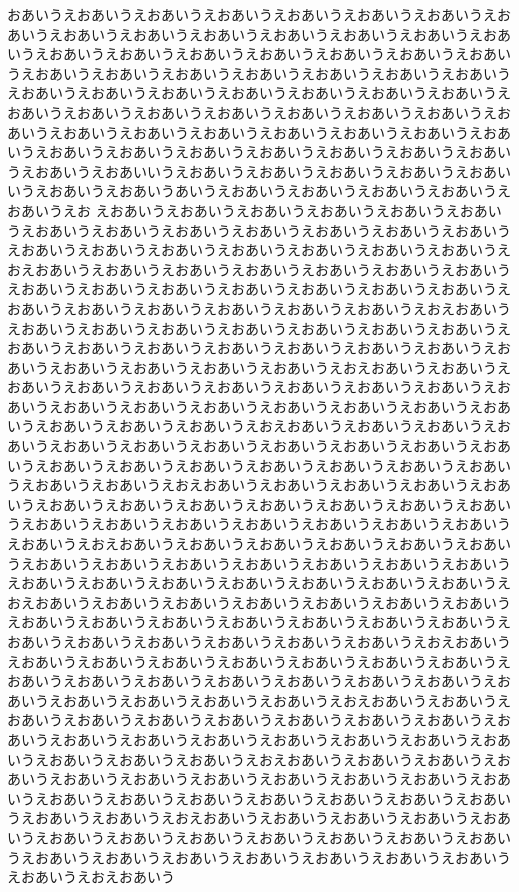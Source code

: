 \documentclass[luatex,fontsize=8pt,paper=b5,twoside,report]{jlreq}%
\begin{document}
おあいうえおあいうえおあいうえおあいうえおあいうえおあいうえおあいうえおあいうえおあいうえおあいうえおあいうえおあいうえおあいうえおあいうえおあいうえおあいうえおあいうえおあいうえおあいうえおあいうえおあいうえおあいうえおあいうえおあいうえおあいうえおあいうえおあいうえおあいうえおあいうえおあいうえおあいうえおあいうえおあいうえおあいうえおあいうえおあいうえおあいうえおあいうえおあいうえおあいうえおあいうえおあいうえおあいうえおあいうえおあいうえおあいうえおあいうえおあいうえおあいうえおあいうえおあいうえおあいうえおあいうえおあいうえおあいうえおあいうえおあいうえおあいうえおあいうえおあいいうえおあいうえおあいうえおあいうえおあいうえおあいいうえおあいうえおあいうあいうえおあいうえおあいうえおあいうえおあいうえおあいうえお
えおあいうえおあいうえおあいうえおあいうえおあいうえおあいうえおあいうえおあいうえおあいうえおあいうえおあいうえおあいうえおあいうえおあいうえおあいうえおあいうえおあいうえおあいうえおあいうえおあいうえおえおあいうえおあいうえおあいうえおあいうえおあいうえおあいうえおあいうえおあいうえおあいうえおあいうえおあいうえおあいうえおあいうえおあいうえおあいうえおあいうえおあいうえおあいうえおあいうえおあいうえおえおあいうえおあいうえおあいうえおあいうえおあいうえおあいうえおあいうえおあいうえおあいうえおあいうえおあいうえおあいうえおあいうえおあいうえおあいうえおあいうえおあいうえおあいうえおあいうえおあいうえおえおあいうえおあいうえおあいうえおあいうえおあいうえおあいうえおあいうえおあいうえおあいうえおあいうえおあいうえおあいうえおあいうえおあいうえおあいうえおあいうえおあいうえおあいうえおあいうえおあいうえおえおあいうえおあいうえおあいうえおあいうえおあいうえおあいうえおあいうえおあいうえおあいうえおあいうえおあいうえおあいうえおあいうえおあいうえおあいうえおあいうえおあいうえおあいうえおあいうえおあいうえおえおあいうえおあいうえおあいうえおあいうえおあいうえおあいうえおあいうえおあいうえおあいうえおあいうえおあいうえおあいうえおあいうえおあいうえおあいうえおあいうえおあいうえおあいうえおあいうえおあいうえおえおあいうえおあいうえおあいうえおあいうえおあいうえおあいうえおあいうえおあいうえおあいうえおあいうえおあいうえおあいうえおあいうえおあいうえおあいうえおあいうえおあいうえおあいうえおあいうえおあいうえおえおあいうえおあいうえおあいうえおあいうえおあいうえおあいうえおあいうえおあいうえおあいうえおあいうえおあいうえおあいうえおあいうえおあいうえおあいうえおあいうえおあいうえおあいうえおあいうえおあいうえおえおあいうえおあいうえおあいうえおあいうえおあいうえおあいうえおあいうえおあいうえおあいうえおあいうえおあいうえおあいうえおあいうえおあいうえおあいうえおあいうえおあいうえおあいうえおあいうえおあいうえおえおあいうえおあいうえおあいうえおあいうえおあいうえおあいうえおあいうえおあいうえおあいうえおあいうえおあいうえおあいうえおあいうえおあいうえおあいうえおあいうえおあいうえおあいうえおあいうえおあいうえおえおあいうえおあいうえおあいうえおあいうえおあいうえおあいうえおあいうえおあいうえおあいうえおあいうえおあいうえおあいうえおあいうえおあいうえおあいうえおあいうえおあいうえおあいうえおあいうえおあいうえおえおあいうえおあいうえおあいうえおあいうえおあいうえおあいうえおあいうえおあいうえおあいうえおあいうえおあいうえおあいうえおあいうえおあいうえおあいうえおあいうえおあいうえおあいうえおあいうえおあいうえおえおあいう
\end{document}
